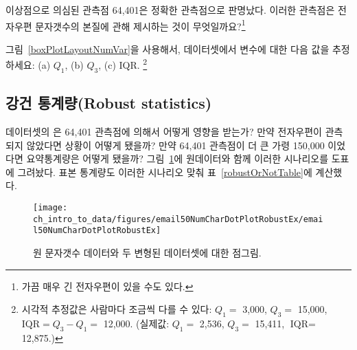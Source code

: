 \begin{exercise}

이상점으로 의심된 관측점 64,401은 정확한 관측점으로 판명났다.
이러한 관측점은 전자우편 문자갯수의 본질에 관해 제시하는 것이 무엇일까요?\footnote{가끔 매우 긴 전자우편이 있을 수도 있다.}\end{exercise}

\begin{exercise}
그림~\ref{boxPlotLayoutNumVar}을 사용해서,  데이터셋에서  변수에 대한 다음 값을 추정하세요: (a) $Q_1$, (b) $Q_3$, (c) IQR. \footnote{시각적 추정값은 사람마다 조금씩 다를 수 있다: $Q_1=$ 3,000, $Q_3=$ 15,000, $\text{IQR}=Q_3 - Q_1 = $ 12,000. (실제값: $Q_1=$ 2,536, $Q_3=$ 15,411, $\text{IQR} = $ 12,875.)}
\end{exercise}



\subsection{강건 통계량(Robust statistics)}

 데이터셋의 은 64,401 관측점에 의해서 어떻게 영향을 받는가?
만약 전자우편이 관측되지 않았다면 상황이 어떻게 됐을까? 만약 64,401 관측점이 더 큰 가령 150,000 이었다면 요약통계량은 어떻게 됐을까? 그림~\ref{email50NumCharDotPlotRobustEx}에 원데이터와 함께 이러한 시나리오를 도표에 그려놨다. 표본 통계량도 이러한 시나리오 맞춰 표~\ref{robustOrNotTable}에 계산했다.

\begin{figure}[ht]
\centering
\texttt{[image: ch\_intro\_to\_data/figures/email50NumCharDotPlotRobustEx/email50NumCharDotPlotRobustEx]}
\caption{원 문자갯수 데이터와 두 변형된 데이터셋에 대한 점그림.}
\label{email50NumCharDotPlotRobustEx}
\end{figure}

